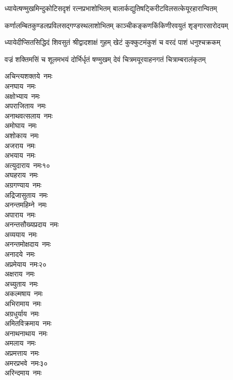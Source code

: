 
\twolineshloka
{ध्यायेत्षण्मुखमिन्दुकोटिसदृशं रत्नप्रभाशोभितम्}
{बालार्कद्युतिषट्किरीटविलसत्केयूरहारान्वितम्}

\twolineshloka
{कर्णालम्बितकुण्डलप्रविलसद्गण्डस्थलाशोभितम्}
{काञ्चीकङ्कणकिंकिणीरवयुतं श‍ृङ्गारसारोदयम्}

\twolineshloka
{ध्यायेदीप्सितसिद्धिदं शिवसुतं श्रीद्वादशाक्षं गुहम्}
{खेटं कुक्कुटमंकुशं च वरदं पाशं धनुश्चक्रकम्}

\twolineshloka
{वज्रं शक्तिमसिं च शूलमभयं दोर्भिर्धृतं षण्मुखम्}
{देवं चित्रमयूरवाहनगतं चित्राम्बरालंकृतम्}


\begin{multicols}{\maxColumns}
\begin{flushleft}
अचिन्त्यशक्तये~नमः\\
अनघाय~नमः\\
अक्षोभ्याय~नमः\\
अपराजिताय~नमः\\
अनाथवत्सलाय~नमः\\
अमोघाय~नमः\\
अशोकाय~नमः\\
अजराय~नमः\\
अभयाय~नमः\\
अत्युदाराय~नमः\hfill १०\\
अघहराय~नमः\\
अग्रगण्याय~नमः\\
अद्रिजासुताय~नमः\\
अनन्तमहिम्ने~नमः\\
अपाराय~नमः\\
अनन्तसौख्यप्रदाय~नमः\\
अव्ययाय~नमः\\
अनन्तमोक्षदाय~नमः\\
अनादये~नमः\\
अप्रमेयाय~नमः\hfill २०\\
अक्षराय~नमः\\
अच्युताय~नमः\\
अकल्मषाय~नमः\\
अभिरामाय~नमः\\
अग्रधुर्याय~नमः\\
अमितविक्रमाय~नमः\\
अनाथनाथाय~नमः\\
अमलाय~नमः\\
अप्रमत्ताय~नमः\\
अमरप्रभवे~नमः\hfill ३०\\
अरिन्दमाय~नमः\\

\end{flushleft}
\end{multicols}
